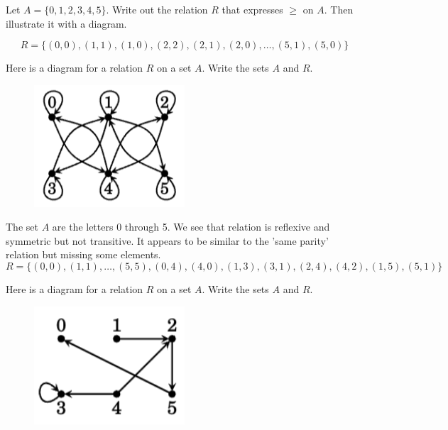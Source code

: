 \documentclass{article}
\begin{document}
\begin{problem}
Let $A = \{0, 1, 2, 3, 4, 5\}$. Write out the relation $R$ that expresses $\geq$ on $A$. Then illustrate it with a diagram.
\end{problem}

$$R = \{(0, 0), (1, 1), (1, 0), (2, 2), (2, 1), (2, 0), \ldots, (5, 1), (5, 0)\}$$

\begin{problem}
Here is a diagram for a relation $R$ on a set $A$. Write the sets $A$ and $R$.
\end{problem}
\begin{figure}[h]
  \centering
  \includegraphics[width=0.5\textwidth]{11.4.png}
  \label{fig:example}
\end{figure}

The set $A$ are the letters 0 through 5. We see that relation is reflexive and symmetric but not transitive. It appears to be similar to the 'same parity' relation but missing some elements.
$$R = \{(0, 0), (1, 1), \ldots, (5, 5), (0, 4), (4, 0), (1, 3), (3, 1), (2, 4), (4, 2), (1, 5), (5, 1)\}$$

\begin{problem}
Here is a diagram for a relation $R$ on a set $A$. Write the sets $A$ and $R$.
\end{problem}

\begin{figure}[h]
  \centering
  \includegraphics[width=0.5\textwidth]{11.5.png}
  \label{fig:example}
\end{figure}
\end{document}
